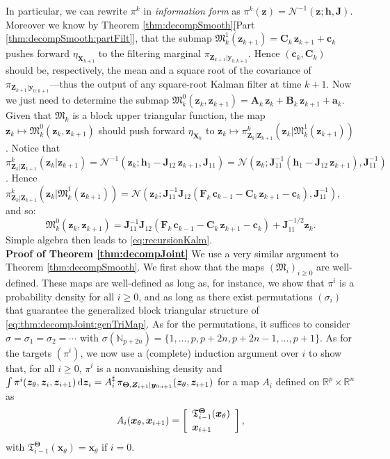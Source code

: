 \documentclass[twoside,11pt]{article}
\newcommand{\Gauss}{\mathcal{N}}                                      %
\newcommand{\re}{\mathbb{R}}
\newcommand{\Xb}{\boldsymbol{X}}
\newcommand{\xb}{\boldsymbol{x}}
\newcommand{\yb}{\boldsymbol{y}}
\newcommand{\Zb}{\boldsymbol{Z}}
\newcommand{\zb}{\boldsymbol{z}}
\newcommand{\Fb}{\boldsymbol{F}}
\newcommand{\hb}{\boldsymbol{h}}
\newcommand{\Ab}{\boldsymbol{A}}
\newcommand{\ab}{\boldsymbol{a}}
\newcommand{\Bb}{\boldsymbol{B}}
\newcommand{\Cb}{\boldsymbol{C}}
\newcommand{\cb}{\boldsymbol{c}}
\newcommand{\Jb}{\boldsymbol{J}}
\newcommand{\vhyp}{\boldsymbol{\Theta}}
\newcommand{\vhyps}{\theta}
\newcommand{\dhyp}{p}
\newcommand{\submap}{\mathfrak{M}}
\newcommand{\pull}{^\sharp}
\begin{document}
In particular, we can rewrite $\pi^k$ in {\it information form} \citep{koller2009probabilistic} 
as
$\pi^k(\zb) = \Gauss^{-1}( \zb ; \hb , \Jb )$.
Moreover we know by Theorem \ref{thm:decompSmooth}[Part \ref{thm:decompSmooth:partFilt}], that
the submap $\submap_k^1(\zb_{k+1}) = \Cb_k\,\zb_{k+1} + \cb_{k}$ pushes
forward $\eta_{\Xb_{k+1}}$ to the filtering marginal $\pi_{\Zb_{k+1}\vert\yb_{0:k+1}}$.
Hence $(\cb_k , \Cb_k)$ should be, respectively,  
the mean and a square root of the covariance of 
$\pi_{\Zb_{k+1}\vert\yb_{0:k+1}}$---thus the output of any
square-root Kalman filter at time $k+1$.
Now we just need to determine the submap 
$\submap^0_k(\zb_k, \zb_{k+1}) = \Ab_k \,\zb_k + \Bb_k \, \zb_{k+1} + \ab_{k}$.
Given that $\submap_k$ is a block upper triangular function, the map
$\zb_k \mapsto \submap^0_k(\zb_k, \zb_{k+1})$ should push forward
$\eta_{\Xb_k}$ to $\zb_k \mapsto \pi^k_{\Zb_k \vert \Zb_{k+1}}( 
\zb_k \vert \submap_k^1(\zb_{k+1}) )$.
Notice that $\pi^k_{\Zb_k \vert \Zb_{k+1} }(\zb_k \vert \zb_{k+1}) = 
\Gauss^{-1}( \zb_k ; \hb_1 - \Jb_{12}\,\zb_{k+1}, \Jb_{11} ) = 
\Gauss(\zb_k; \Jb_{11}^{-1}(\hb_1 - \Jb_{12}\,\zb_{k+1}) , \Jb_{11}^{-1} )$.
Hence 
$\pi^k_{\Zb_k \vert \Zb_{k+1} }( \zb_k \vert \submap_k^1(\zb_{k+1}) ) = 
\Gauss(\zb_k; 
\Jb_{11}^{-1} \Jb_{12}(\Fb_k\,\cb_{k-1} - \Cb_k\,\zb_{k+1}-\cb_k) , \Jb_{11}^{-1} )$, and so:
\begin{equation}
\submap^0_k(\zb_k, \zb_{k+1}) = 
\Jb_{11}^{-1} \Jb_{12}(\Fb_k\,\cb_{k-1} - \Cb_k\,\zb_{k+1}-\cb_k) + \Jb_{11}^{-1/2} \zb_k.
\end{equation}
Simple algebra then leads to \eqref{eq:recursionKalm}. 
%
\hfill\BlackBox\\[2mm]


\noindent
{\bf Proof of Theorem \ref{thm:decompJoint}}
We use a very similar argument to Theorem \ref{thm:decompSmooth}.
We first show that the maps $(\submap_i)_{i \ge 0}$ are well-defined.
%
These maps are well-defined as long as, for instance,  we show that
%
$\pi^i$ is a probability density 
for all $i\ge 0$, and as long
as there exist permutations $(\sigma_i)$ that guarantee the generalized
block
triangular structure of \eqref{eq:thm:decompJoint:genTriMap}.
As for the permutations, it suffices to consider 
$\sigma = \sigma_1 = \sigma_2 = \cdots$ with
$\sigma(\mathbb{N}_{\dhyp+2n}) = \{1,\ldots,\dhyp, \dhyp+2n, \dhyp+2n-1, \ldots, \dhyp+1 \}$.
As for the targets $(\pi^i)$, we now
use a (complete) induction argument over $i$
to show that,
for
all $ i\ge 0$,   
$\pi^i$ is a nonvanishing density and
%
%
%
$\int \pi^i(\zb_{\vhyps},\zb_i,\zb_{i+1}) \, {\rm d}\zb_{i} =  
A_i\pull\,\pi_{\vhyp, \Zb_{i+1} \vert \yb_{0:i+1}}(\zb_{\vhyps},\zb_{i+1})$ 
for a map $A_i$ defined
on $\re^{\dhyp} \times \re^n$ as
    \begin{equation}   
      A_i( \xb_{\vhyps} , \xb_{i+1} ) = 
      \left[\begin{array}{l}
      \mathfrak{T}^{\vhyp}_{i-1}(  \xb_{\vhyps} )\\[\spacinglines] 
      \xb_{i+1}
      \end{array}\right],%
    \end{equation}
with $\mathfrak{T}^{\vhyp}_{i-1}(\xb_{\vhyps}) = \xb_{\vhyps}$ if $i=0$.
\end{document}
